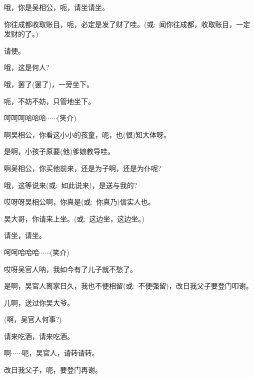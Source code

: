 {{

{\vspace{5pt}}


{哦，你是吴相公，呃，请坐请坐。}

{你往成都收取账目，呃，必定是发了财了哇。({\akai 或}:~}闻你往成都，收取账目，一定发财的了。{)}

{请便。}

{哦，这是何人?}

{哦，罢了(罢了)，一旁坐下。}

{呃，不妨不妨，只管地坐下。}

{呵呵呵哈哈哈$\cdots{}\cdots{}$({\hwfs 笑介})}

{啊吴相公，你看这小小的孩童，呃，也(很)知大体呀。}

{是啊，小孩子原要(他)爹娘教导哇。}

{啊吴相公，你买他前来，还是为子啊，还是为仆呢?}

{哦，这等说来({\akai 或}:~}如此说来){，是送与我的?}

{哎呀呀吴相公啊，你真是({\akai 或}:~}你真乃){信实人也。}


{吴大哥，你请来上坐。({\akai 或}:~这边坐，这边坐。)}

{请坐，请坐。}


{呵呵哈哈哈$\cdots{}\cdots{}$({\hwfs 笑介})}

{哎呀吴官人呐，我如今有了儿子就不愁了。}

{是啊，吴官人离家日久，我也不便相留({\akai 或}:~不便强留)，改日我父子要登门叩谢。}

{儿啊，送过你吴大爷。}

{(啊，吴官人何事?)}

{请来吃酒，请来吃酒。}

{啊$\cdots{}\cdots{}$呃，吴官人，请转请转。}

{改日我父子，呃，要登门再谢。}

}}
